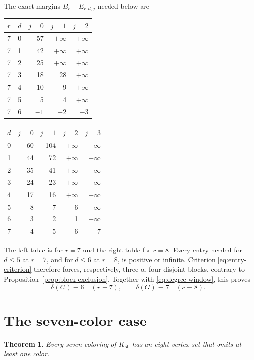 \documentclass[11pt,reqno,a4paper]{amsart}
\newtheorem{theorem}{Theorem}[section]
\theoremstyle{definition}
\theoremstyle{remark}
\begin{document}
The exact margins $B_r-E_{r,d,j}$ needed below are
\begin{center}
\begin{tabular}{c@{\quad}c@{\quad}rrr}
\toprule
$r$&$d$&$j=0$&$j=1$&$j=2$\\
\midrule
7&0&57&$+\infty$&$+\infty$\\
7&1&42&$+\infty$&$+\infty$\\
7&2&25&$+\infty$&$+\infty$\\
7&3&18&28&$+\infty$\\
7&4&10&9&$+\infty$\\
7&5&5&4&$+\infty$\\
7&6&$-1$&$-2$&$-3$\\
\bottomrule
\end{tabular}
\qquad
\begin{tabular}{c@{\quad}rrrr}
\toprule
$d$&$j=0$&$j=1$&$j=2$&$j=3$\\
\midrule
0&60&104&$+\infty$&$+\infty$\\
1&44&72&$+\infty$&$+\infty$\\
2&35&41&$+\infty$&$+\infty$\\
3&24&23&$+\infty$&$+\infty$\\
4&17&16&$+\infty$&$+\infty$\\
5&8&7&6&$+\infty$\\
6&3&2&1&$+\infty$\\
7&$-4$&$-5$&$-6$&$-7$\\
\bottomrule
\end{tabular}
\end{center}
The left table is for $r=7$ and the right table for $r=8$. Every entry
needed for $d\leq5$ at $r=7$, and for $d\leq6$ at $r=8$, is positive
or infinite. Criterion \eqref{eq:entry-criterion} therefore forces,
respectively, three or four disjoint blocks, contrary to
Proposition~\ref{prop:block-exclusion}. Together with
\eqref{eq:degree-window}, this proves
\begin{equation}\label{eq:fixed-degree-reductions}
 \delta(G)=6\quad(r=7),
 \qquad \delta(G)=7\quad(r=8).
\end{equation}

\section{The seven-color case}\label{sec:r7}

\begin{theorem}\label{thm:r7}
Every seven-coloring of $K_{50}$ has an eight-vertex set that omits at
least one color.
\end{theorem}
\end{document}
